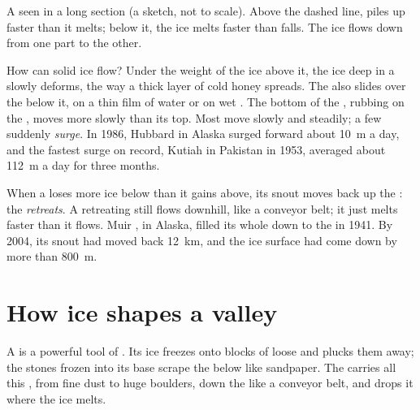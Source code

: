 \begin{omfigure}
{\small A   seen in a long section (a sketch, not to scale).
Above the dashed line,  piles up faster than it melts; below it, the
ice melts faster than  falls. The ice flows down from one part to the
other.}
\label{fig:g8:ice-on-earth:long-section}
\end{omfigure}

How can solid ice flow? Under the weight of the ice above it, the ice deep
in a  slowly deforms, the way a thick layer of cold honey spreads.
The  also slides over the  below it, on a thin film of water or
on wet . The bottom of the , rubbing on the , moves more
slowly than its top. Most  move slowly and steadily; a few
suddenly \emph{surge}. In 1986, Hubbard  in Alaska surged forward
about \qty{10}{m} a day, and the fastest surge on record, Kutiah 
in Pakistan in 1953, averaged about \qty{112}{m} a day for three months.

When a  loses more ice below than it gains above, its snout moves
back up the : the  \emph{retreats}. A retreating 
still flows downhill, like a conveyor belt; it just melts faster than it
flows. Muir , in Alaska, filled its whole  down to the 
in 1941. By 2004, its snout had moved back \qty{12}{km}, and the ice
surface had come down by more than \qty{800}{m}.

\section{How ice shapes a valley}

A  is a powerful tool of . Its ice freezes onto blocks of
loose  and plucks them away; the stones frozen into its base scrape
the  below like sandpaper. The  carries all this , from
fine dust to huge boulders, down the  like a conveyor belt, and
drops it where the ice melts.

